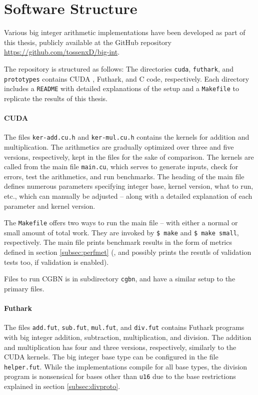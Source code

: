 \section{Software Structure}
\label{sec:software}

Various big integer arithmetic implementations have been developed as part of
this thesis, publicly available at the GitHub repository
\url{https://github.com/tossenxD/big-int}.

The repository is structured as follows: The directories \texttt{cuda},
\texttt{futhark}, and \texttt{prototypes} contains CUDA \cpp, Futhark, and C
code, respectively. Each directory includes a \texttt{README} with detailed
explanations of the setup and a \texttt{Makefile} to replicate the results of
this thesis.

\paragraph{CUDA \cpp}
The files \texttt{ker-add.cu.h} and \texttt{ker-mul.cu.h} contains the kernels
for addition and multiplication. The arithmetics are gradually optimized over
three and five versions, respectively, kept in the files for the sake of
comparison. The kernels are called from the main file \texttt{main.cu}, which
serves to generate inputs, check for errors, test the arithmetics, and run
benchmarks. The heading of the main file defines numerous parameters specifying
integer base, kernel version, what to run, etc., which can manually be adjusted
-- along with a detailed explanation of each parameter and kernel version.

The \texttt{Makefile} offers two ways to run the main file -- with either a
normal or small amount of total work. They are invoked by \texttt{\$ make} and
\texttt{\$ make small}, respectively. The main file prints benchmark results in
the form of metrics defined in section \ref{subsec:perfmet} (, and possibly
prints the resutls of validation tests too, if validation is enabled).

Files to run CGBN is in subdirectory \texttt{cgbn}, and have a similar setup to
the primary files.

\paragraph{Futhark}
The files \texttt{add.fut}, \texttt{sub.fut}, \texttt{mul.fut}, and
\texttt{div.fut} contains Futhark programs with big integer addition,
subtraction, multiplication, and division. The addition and multiplication has
four and three versions, respectively, similarly to the CUDA kernels. The big
integer base type can be configured in the file \texttt{helper.fut}. While the
implementations compile for all base types, the division program is nonsensical
for bases other than \texttt{u16} due to the base restrictions explained in
section \ref{subsec:divproto}.


